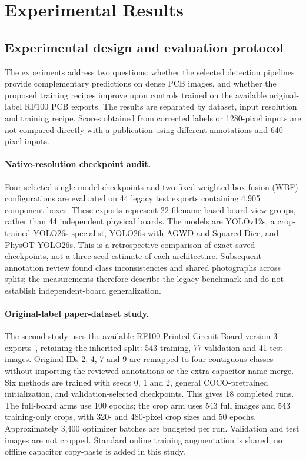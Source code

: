 \section{Experimental Results}
\label{sec:experiments}

\subsection{Experimental design and evaluation protocol}
The experiments address two questions: whether the selected detection pipelines
provide complementary predictions on dense PCB images, and whether the proposed
training recipes improve upon controls trained on the available original-label
RF100 PCB exports. The results are separated by dataset, input resolution and
training recipe. Scores obtained from corrected labels or 1280-pixel inputs are
not compared directly with a publication using different annotations and
640-pixel inputs.

\paragraph{Native-resolution checkpoint audit.}
Four selected single-model checkpoints and two fixed weighted box fusion (WBF)
configurations are evaluated on 44 legacy test exports containing 4,905 component
boxes. These exports represent 22 filename-based board-view groups, rather than
44 independent physical boards. The models are YOLOv12s, a crop-trained YOLO26s
specialist, YOLO26s with AGWD and Squared-Dice, and PhysOT-YOLO26s. This is a
retrospective comparison of exact saved checkpoints, not a three-seed estimate
of each architecture. Subsequent annotation review found class inconsistencies
and shared photographs across splits; the measurements therefore describe the
legacy benchmark and do not establish independent-board generalization.

\paragraph{Original-label paper-dataset study.}
The second study uses the available RF100 Printed Circuit Board version-3
exports~\cite{rf100pcb}, retaining the inherited split: 543 training, 77 validation
and 41 test images. Original IDs 2, 4, 7 and 9 are remapped to four contiguous
classes without importing the reviewed annotations or the extra capacitor-name
merge. Six methods are trained with seeds 0, 1 and 2, general COCO-pretrained
initialization, and validation-selected checkpoints. This gives 18 completed
runs. The full-board arms use 100 epochs; the crop arm uses 543 full images and
543 training-only crops, with 320- and 480-pixel crop sizes and 50 epochs.
Approximately 3,400 optimizer batches are budgeted per run. Validation and test
images are not cropped. Standard online training augmentation is shared; no
offline capacitor copy-paste is added in this study.

